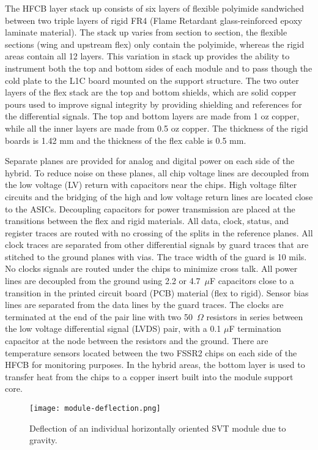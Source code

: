 The HFCB layer stack up consists of six layers of flexible polyimide sandwiched between two triple layers of rigid FR4 (Flame Retardant glass-reinforced epoxy laminate material). The stack up varies from section to section, the flexible sections (wing and upstream flex) only contain the polyimide, whereas the rigid areas contain all 12 layers. This variation in stack up provides the ability to instrument both the top and bottom sides of each module and to pass though the cold plate to the L1C board mounted on the support structure. The two outer layers of the flex stack are the top and bottom shields, which are solid copper pours used to improve signal integrity by providing shielding and references for the differential signals. The top and bottom layers are made from 1 oz copper, while all the inner layers are made from 0.5 oz copper. The thickness of the rigid boards is 1.42 mm and the thickness of the flex cable is 0.5 mm.

Separate planes are provided for analog and digital power on each side of the hybrid. To reduce noise on these planes, all chip voltage lines are decoupled from the low voltage (LV) return with capacitors near the chips. High voltage filter circuits and the bridging of the high and low voltage return lines are located close to the ASICs. Decoupling capacitors for power transmission are placed at the transitions between the flex and rigid materials. All data, clock, status, and register traces are routed with no crossing of the splits in the reference planes. All clock traces are separated from other differential signals by guard traces that are stitched to the ground planes with vias. The trace width of the guard is 10 mils. No clocks signals are routed under the chips to minimize cross talk. All power lines are  decoupled from the ground using 2.2 or 4.7~$\mu$F capacitors close to a transition in the printed circuit board (PCB) material (flex to rigid). Sensor bias lines are separated from the data lines by the guard traces. The clocks are terminated at the end of the pair line with two 50~$\Omega$ resistors in series between the low voltage differential signal (LVDS) pair, with a 0.1 $\mu$F termination capacitor at the node between the resistors and the ground. There are temperature sensors located between the two FSSR2 chips on each side of the HFCB for monitoring purposes. In the hybrid areas, the bottom layer is used to transfer heat from the chips to a copper insert built into the module support core.

\begin{figure}[hbt] 
\centering 
\texttt{[image: module-deflection.png]}
\caption{Deflection of an individual horizontally oriented SVT module due to gravity.}
\label{fig:module-deflection}
\end{figure}

